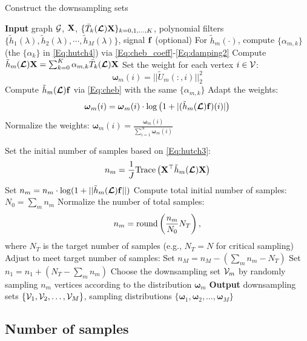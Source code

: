 \documentclass[journal, 10pt]{IEEEtran}
\begin{document}
\begin{algorithm}[tb]
\caption{Construct the downsampling sets}
\begin{algorithmic}
\State \textbf{Input} graph ${\mathcal{G}}$,  ${\bf X}$, $\{\bar{T}_k(\boldsymbol{\mathcal{L}}){\bf X}\}_{k=0,1,\ldots,K}$, polynomial filters $\{ \tilde{h}_1(\lambda), \tilde{h}_2(\lambda), \cdots, \tilde{h}_M(\lambda)\}$, signal ${\bf f}$ (optional)
\State For $\tilde{h}_m(\cdot)$, compute $\{\alpha_{m,k}\}$ (the $\{\alpha_k\}$ in \eqref{Eq:hutch4}) via \eqref{Eq:cheb_coeff}-\eqref{Eq:damping2}
\State Compute $\tilde{h}_m(\boldsymbol{\mathcal{L}}){\bf X}=\sum_{k=0}^K \alpha_{m,k}\bar{T}_k(\boldsymbol{\mathcal{L}}){\bf X}$
\State Set the weight for each vertex $i \in {\mathcal{V}}$: 
$${\boldsymbol \omega}_m(i) = ||\tilde{U}_m(:,i)||^2_2$$
\State Compute $\tilde{h}_m(\boldsymbol{\mathcal{L}}){\bf f}$ via \eqref{Eq:cheb} with the same $\{\alpha_{m,k}\}$
\State Adapt the weights: $${\boldsymbol \omega}_m(i) = {\boldsymbol \omega}_m(i) \cdot \log\left(1+|(\tilde{h}_m(\boldsymbol{\mathcal{L}}){\bf f})(i)|\right)$$
\EndIf
\State Normalize the weights: ${\boldsymbol \omega}_m(i)=\frac{{\boldsymbol \omega}_m(i)}{\sum_{i=1}^N {\boldsymbol \omega}_m(i)}$

\State Set the initial number of samples based on \eqref{Eq:hutch3}: 
$$n_m = \frac{1}{J} \mathrm{Trace}\left({\bf X}^\top \tilde{h}_m(\boldsymbol{\mathcal{L}})\bf{X}\right)$$
\EndFor
{}
\State Set $n_m=n_m \cdot \log(1+||\tilde{h}_m(\boldsymbol{\mathcal{L}}){\bf f}||)$
\EndFor
\EndIf
\State Compute total initial number of samples: $N_0 = \sum_m n_m$
\State Normalize the number of total samples: $$n_m = \hbox{round}\left(\frac{n_m}{N_0}N_T\right),$$
where $N_T$ is the target number of samples (e.g., $N_T=N$ for critical sampling)
\EndFor
\State Adjust to meet target number of samples:  
\State Set $n_M = n_M - (\sum_m n_m -N_T)$
\State Set $n_1 = n_1 + (N_T-\sum_m n_m)$
\EndIf
\State Choose the downsampling set ${\mathcal{V}}_m$ by randomly sampling $n_m$ vertices according to the distribution ${\boldsymbol \omega}_m$
\EndFor
\State \textbf{Output} downsampling sets $\{{\mathcal{V}}_1,{\mathcal{V}}_2, \ldots, {\mathcal{V}}_M\}$, sampling distributions $\{{\boldsymbol \omega}_1,{\boldsymbol \omega}_2,\ldots,{\boldsymbol \omega}_M\}$
\end{algorithmic}
\label{Al:downsampling}
\end{algorithm}

\subsection{Number of samples}
\end{document}
